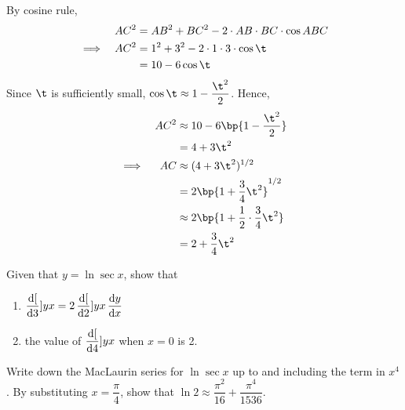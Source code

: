 \documentclass{echw}
\begin{document}
    \solution
        By cosine rule,
        \begin{alignat*}{2}
            &&AC^2 &= AB^2 + BC^2 - 2\cdot AB \cdot BC \cdot \cos ABC\\
            \implies&&AC^2 &= 1^2 + 3^2 - 2 \cdot 1 \cdot 3 \cdot \cos \t\\
            && &= 10 - 6 \cos\t
        \end{alignat*}
        Since $\t$ is sufficiently small, $\cos \t \approx 1 - \dfrac{\t^2}{2}$. Hence,
        \begin{alignat*}{2}
            &&AC^2 &\approx 10 - 6\bp{1 - \dfrac{\t^2}{2}}\\
            && &= 4 + 3\t^2\\
            \implies&&AC &\approx (4+3\t^2)^{1/2}\\
            && &= 2\bp{1 + \dfrac34 \t^2}^{1/2}\\
            && &\approx 2 \bp{1 + \dfrac12 \cdot \dfrac34 \t^2}\\
            && &= 2 + \dfrac34 \t^2
        \end{alignat*}

    \problem{}
        Given that $y = \ln \sec x$, show that

        \begin{enumerate}
            \item $\dfrac{\mathrm{d} [}{\mathrm{d} 3}]{y}{x} = 2 \, \dfrac{\mathrm{d} [}{\mathrm{d} 2}]{y}{x} \, \dfrac{\mathrm{d} y}{\mathrm{d} x}$
            \item the value of $\dfrac{\mathrm{d} [}{\mathrm{d} 4}]{y}{x}$ when $x = 0$ is 2.
        \end{enumerate}

         Write down the MacLaurin series for $\ln \sec x$ up to and including the term in $x^4$. By substituting $x = \dfrac\pi4$, show that $\ln 2 \approx \dfrac{\pi^2}{16} + \dfrac{\pi^4}{1536}$.

    \solution
\end{document}
